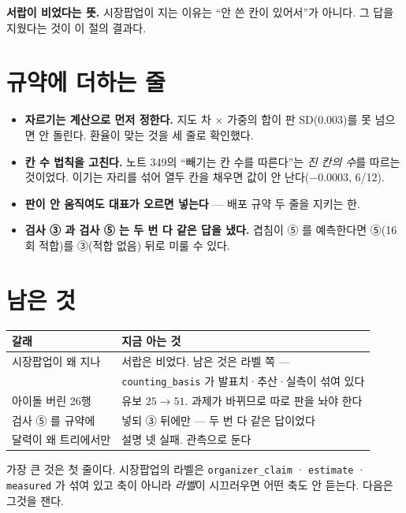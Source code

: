 \documentclass[11pt]{article}
\begin{document}
\textbf{서랍이 비었다는 뜻.} 시장팝업이 지는 이유는 ``안 쓴 칸이 있어서''가
아니다. 그 답을 지웠다는 것이 이 절의 결과다.

\section{규약에 더하는 줄}

\begin{itemize}
\item \textbf{자르기는 계산으로 먼저 정한다.} 지도 차 $\times$ 가중의
합이 판 SD(0.003)를 못 넘으면 안 돌린다. 환율이 맞는 것을 세 줄로
확인했다.
\item \textbf{칸 수 법칙을 고친다.} 노트 349의 ``빼기는 칸 수를 따른다''는
\emph{진 칸의 수}를 따르는 것이었다. 이기는 자리를 섞어 열두 칸을
채우면 값이 안 난다($-0.0003$, 6/12).
\item \textbf{판이 안 움직여도 대표가 오르면 넣는다} --- 배포 규약 두
줄을 지키는 한.
\item \textbf{검사 ③ 과 검사 ⑤ 는 두 번 다 같은 답을 냈다.} 겹침이 ⑤ 를
예측한다면 ⑤(16회 적합)를 ③(적합 없음) 뒤로 미룰 수 있다.
\end{itemize}

\section{남은 것}

\begin{center}
\begin{tabular}{ll}
\hline
갈래 & 지금 아는 것 \\
\hline
시장팝업이 왜 지나 & 서랍은 비었다. 남은 것은 라벨 쪽 --- \\
 & \texttt{counting\_basis} 가 발표치·추산·실측이 섞여 있다 \\
아이돌 버린 26행 & 유보 $25\to51$. 과제가 바뀌므로 따로 판을 놔야 한다 \\
검사 ⑤ 를 규약에 & 넣되 ③ 뒤에만 --- 두 번 다 같은 답이었다 \\
달력이 왜 트리에서만 & 설명 넷 실패. 관측으로 둔다 \\
\hline
\end{tabular}
\end{center}

가장 큰 것은 첫 줄이다. 시장팝업의 라벨은 \texttt{organizer\_claim} ·
\texttt{estimate} · \texttt{measured} 가 섞여 있고 축이 아니라 \emph{라벨}이
시끄러우면 어떤 축도 안 듣는다. 다음은 그것을 잰다.
\end{document}
